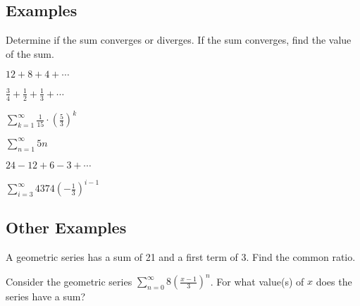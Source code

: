 \documentclass[addpoints]{exam}
\begin{document}
\subsection*{Examples}
Determine if the sum converges or diverges. If the sum converges, find the value of the sum.
\begin{questions}
    \begin{minipage}{.45\linewidth}
        \question $\displaystyle12+8+4+\cdots$
    \end{minipage}
    \hfill
    \begin{minipage}{.45\linewidth}
        \question $\displaystyle\frac{3}{4}+\frac{1}{2}+\frac{1}{3}+\cdots$
    \end{minipage}


    \begin{minipage}{.45\linewidth}
        \question $\displaystyle\sum_{k=1}^\infty \frac{1}{15}\cdot\left(\frac{5}{3}\right)^k$
    \end{minipage}
    \hfill
    \begin{minipage}{.45\linewidth}
        \question $\displaystyle\sum_{n=1}^\infty 5n$
    \end{minipage}


    \begin{minipage}{.45\linewidth}
        \question $\displaystyle 24-12+6-3+\cdots$
    \end{minipage}
    \hfill
    \begin{minipage}{.45\linewidth}
        \question $\displaystyle \sum_{i=3}^\infty4374\left(-\frac{1}{3}\right)^{i-1}$
    \end{minipage}

\end{questions}

\newpage

\subsection*{Other Examples}

\begin{questions}
    \question A geometric series has a sum of 21 and a first term of 3. Find the common ratio.


    \question Consider the geometric series $\displaystyle\sum_{n=0}^\infty 8\left(\frac{x-1}{3}\right)^n$. For what value(s) of $x$ does the series have a sum?
    
\end{questions}
\end{document}

